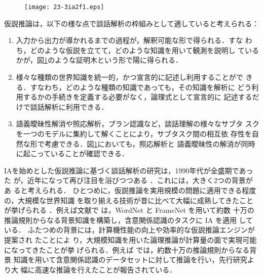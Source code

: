 \documentclass[japanese]{jnlp_1.4}
\begin{document}
\begin{figure}[t]
\begin{center}
\texttt{[image: 23-3ia2f1.eps]}
\end{center}
\label{fig:ia}
\end{figure}

仮説推論は，以下の様な点で談話解析の枠組みとして適していると考えられる：
\begin{enumerate}
\item
入力から出力が導かれるまでの過程が，解釈可能な形で得られる．すな
わち，どのような仮説を立てて，どのような知識を用いて観測を説明し
ているかが，図\ref{fig:ia}のような証明木という形で陽に得られる．
\item
様々な種類の世界知識を統一的，かつ宣言的に記述し利用することがで
きる．すなわち，どのような種類の知識であっても，その知識を解析に
どう利用するかの手続きを定義する必要がなく，論理式として宣言的に
記述するだけで談話解析に利用できる．
\item
語義曖昧性解消や照応解析，プラン認識など，談話理解の様々なサブタ
スクを一つのモデルに集約して解くことにより，サブタスク間の相互依
存性を自然な形で考慮できる．図\ref{fig:ia}においても，照応解析と
語義曖昧性の解消が同時に起こっていることが確認できる．
\end{enumerate}

IAを始めとした仮説推論に基づく談話解析の研究は，1990年代が全盛期であった
が，近年になって再び注目を浴びつつある
\cite{Blythe11,Ovch11,Inoue12,Sugiura12}．これには，大きく2つの背景があ
ると考えられる．
ひとつめに，仮説推論を実用規模の問題に適用できる程度の，大規模な世界知識
を取り揃える技術が昔に比べて大幅に成熟してきたことが挙げられる
\cite{fellbaum98,framenetII,Chambers09,Scho10}．例えば文献\cite{Ovch11}で
は，WordNet \cite{fellbaum98} と FrameNet \cite{framenetII} を用いて約数
十万の推論規則からなる背景知識を構築し，含意関係認識のタスクに IA を適用
している．
ふたつめの背景には，計算機性能の向上や効率的な仮説推論エンジンが提案され
た\cite{Mulkar07,Blythe11,Inoue11,Inoue12,Yamamoto15,Schuller15}ことによ
り，大規模知識を用いた論理推論が計算量の面で実現可能になってきたことが挙
げられる．例えば \cite{Inoue12} では，約数十万の推論規則からなる背景
知識を用いて含意関係認識のデータセットに対して推論を行い，先行研究より大
幅に高速な推論を行えたことが報告されている．
\end{document}
